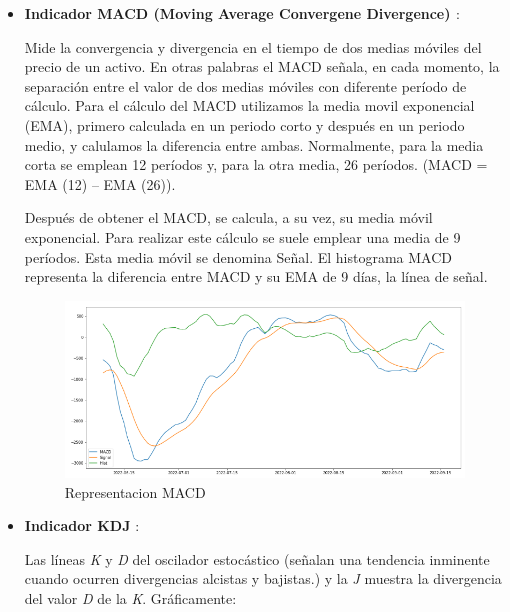 \documentclass[11pt]{article} %
\begin{document}
\begin{itemize}
	\item \textbf{Indicador MACD (Moving Average Convergene Divergence) \cite{macd} }:

Mide la convergencia y divergencia en el tiempo de dos medias móviles del precio de un activo. En otras palabras el MACD señala, en cada momento, la separación entre el valor de dos medias móviles con diferente período de cálculo. Para el cálculo del MACD utilizamos la media movil exponencial (EMA), primero calculada en un periodo corto y después en un periodo medio, y calulamos la diferencia entre ambas. Normalmente, para la media corta se emplean 12 períodos y, para la otra media, 26 períodos. (MACD = EMA (12) – EMA (26)).

Después de obtener el MACD, se calcula, a su vez, su media móvil exponencial. Para realizar este cálculo se suele emplear una media de 9 períodos. Esta media móvil se denomina Señal. El histograma MACD representa la diferencia entre MACD y su EMA de 9 días, la línea de señal.

\begin{center}
	\begin{figure}[htb]
		\centering
		\includegraphics[scale = 0.6]{macd.png}
		\caption{Representacion MACD}
	\end{figure}
\end{center}

\newpage

	\item \textbf{Indicador KDJ }:
	
Las líneas \textit{K} y \textit{D} del oscilador estocástico (señalan una tendencia inminente cuando ocurren divergencias alcistas y bajistas.) y la \textit{J} muestra la divergencia del valor \textit{D} de la \textit{K}. Gráficamente:


\end{itemize}
\end{document}
